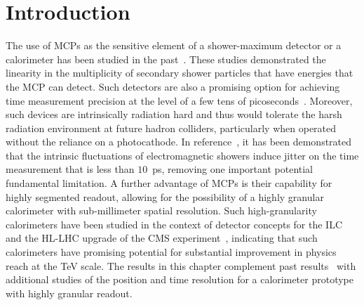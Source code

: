 \section{Introduction}
The use of MCPs as the sensitive element of a shower-maximum
detector or a calorimeter has been studied in the
past~\cite{Derevshchikov:1990ej,Albayrak-Yetkin:2013xga}. These studies
demonstrated the linearity in the multiplicity of secondary shower particles
that have energies that the MCP can detect. Such detectors are also a promising
option for achieving time measurement precision at the level of a few tens of
picoseconds~\cite{MCPFastCaloNIMA,Ronzhin:2015pba,Ronzhin2015288,Brianza2015216}.
Moreover, such devices are intrinsically radiation hard and thus would tolerate
the harsh radiation environment at future hadron colliders, particularly when
operated without the reliance on a photocathode. In
reference~\cite{Ronzhin2015288}, it has been demonstrated that the intrinsic
fluctuations of electromagnetic showers induce jitter on the time measurement
that is less than $10$~ps, removing one important potential fundamental
limitation. A further advantage of MCPs is their capability for highly
segmented readout, allowing for the possibility of a highly granular calorimeter
with sub-millimeter spatial resolution. Such high-granularity calorimeters have
been studied in the context of detector concepts for the
ILC~\cite{Grondin:2010fe} and the HL-LHC upgrade of the CMS
experiment~\cite{Butler:2020886}, indicating that such calorimeters have
promising potential for substantial improvement in physics reach at the TeV
scale. The results in this chapter complement past
results~\cite{Anderson:2015gha,MCPFastCaloNIMA,Ronzhin:2015pba,Ronzhin2015288}
with additional studies of the position and time resolution for a calorimeter
prototype with highly granular readout.


